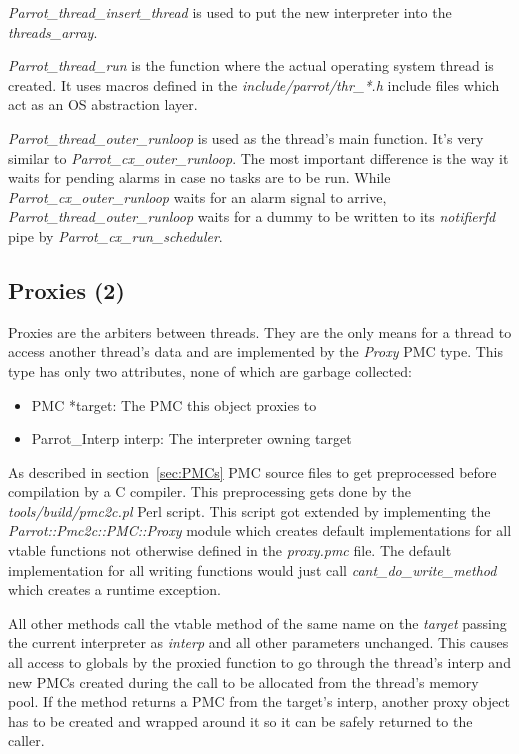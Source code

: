 \documentclass[bachelor,english]{hgbthesis}
\begin{document}
\textit{Parrot\_thread\_insert\_thread} is used to put the new interpreter into the \textit{threads\_array}.

\textit{Parrot\_thread\_run} is the function where the actual operating system thread is created. It uses macros defined in the \textit{include/parrot/thr\_*.h} include files which act as an OS abstraction layer.

\textit{Parrot\_thread\_outer\_runloop} is used as the thread's main function. It's very similar to \textit{Parrot\_cx\_outer\_runloop}. The most important difference is the way it waits for pending alarms in case no tasks are to be run. While \textit{Parrot\_cx\_outer\_runloop} waits for an alarm signal to arrive, \textit{Parrot\_thread\_outer\_runloop} waits for a dummy to be written to its \textit{notifierfd} pipe by \textit{Parrot\_cx\_run\_scheduler}.

\subsection{Proxies (2)}

Proxies are the arbiters between threads. They are the only means for a thread to access another thread's data and are implemented by the \textit{Proxy} PMC type. This type has only two attributes, none of which are garbage collected:
%
\begin{itemize}
\item PMC *target: The PMC this object proxies to
\item Parrot\_Interp interp: The interpreter owning target
\end{itemize}

As described in section~\ref{sec:PMCs} PMC source files to get preprocessed before compilation by a C compiler. This preprocessing gets done by the \textit{tools/build/pmc2c.pl} Perl script. This script got extended by implementing the \textit{Parrot::Pmc2c::PMC::Proxy} module which creates default implementations for all vtable functions not otherwise defined in the \textit{proxy.pmc} file. The default implementation for all writing functions would just call \textit{cant\_do\_write\_method} which creates a runtime exception.

All other methods call the vtable method of the same name on the \textit{target} passing the current interpreter as \textit{interp} and all other parameters unchanged. This causes all access to globals by the proxied function to go through the thread's interp and new PMCs created during the call to be allocated from the thread's memory pool. If the method returns a PMC from the target's interp, another proxy object has to be created and wrapped around it so it can be safely returned to the caller.
\end{document}
